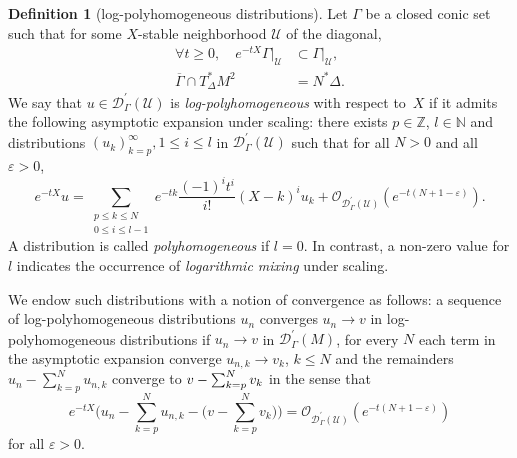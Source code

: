 \documentclass[JEP,XML,SOM,Unicode]{cedram}
\let\pazocal\mathscr
\theoremstyle{definition}
\newtheorem{definition}[theorem]{Definition}
\newcommand\nn{{\mathbb N}}
\let\euler X
\begin{document}
\begin{definition}[log-polyhomogeneous distributions]
Let $\Gamma$ be a closed conic set
such that for some $\euler$-stable neighborhood $\pazocal{U}$ of the diagonal,
\begin{align*}
\forall t\geqslant 0, \quad e^{-t\euler}\Gamma|_\pazocal{U}&\subset \Gamma|_{\pazocal{U}},\\
\overline{\Gamma}\cap T^*_\Delta M^2&=N^*\Delta.
\end{align*}
We say that $u\in \pazocal{D}^\prime_\Gamma(\pazocal{U})$ is \emph{log-polyhomogeneous} with respect to~$\euler$ if
it admits the following asymptotic expansion under scaling: there exists $p\in \mathbb{Z}$, {$l\in \nn$}
and distributions $(u_k)_{k=p}^{\infty}, 1\leqslant i \leqslant l $
in $\pazocal{D}^\prime_\Gamma(\pazocal{U})$ such that for all $N>0$ and all $\varepsilon>0$,
\begin{equation}\label{phexp}
e^{-t\euler}u=\sum_{\substack{p\leqslant k\leqslant N\\0\leqslant i\leqslant l-1}} e^{-tk} \frac{(-1)^i t^i}{i!}\left(\euler-k\right)^i u_k +\pazocal{O}_{\pazocal{D}^\prime_\Gamma(\pazocal{U})}(e^{-t(N+1-\varepsilon)}).
\end{equation}
A distribution is called \emph{polyhomogeneous} if $l=0$. In contrast, a non-zero value for $l$ indicates the occurrence of \emph{logarithmic mixing} under scaling.

We endow such {distributions} with a notion of convergence as follows: a sequence of
log-polyhomogeneous {distributions} $u_n$ converges
$u_n\to v$ in log-polyhomogeneous {distributions} if
$u_n\to v$ in $\pazocal{D}^\prime_\Gamma(M)$, for every $N$ each term in the asymptotic expansion converge
$u_{n,k}\to v_{k}$, $k\leqslant N $ and the remainders $u_n-\sum_{k=p}^N u_{n,k} $ converge to $v-\nobreak\sum_{k=p}^N v_{k} $ in the sense that
\[
e^{-t\euler}\bigg(u_n-\sum_{k=p}^N u_{n,k}- \Big(v-\sum_{k=p}^N v_{k} \Big)\bigg)=\pazocal{O}_{\pazocal{D}^\prime_\Gamma(\pazocal{U})}(e^{-t(N+1-\varepsilon)})
\]
for all
$\varepsilon>0$.
\end{definition}
\end{document}
